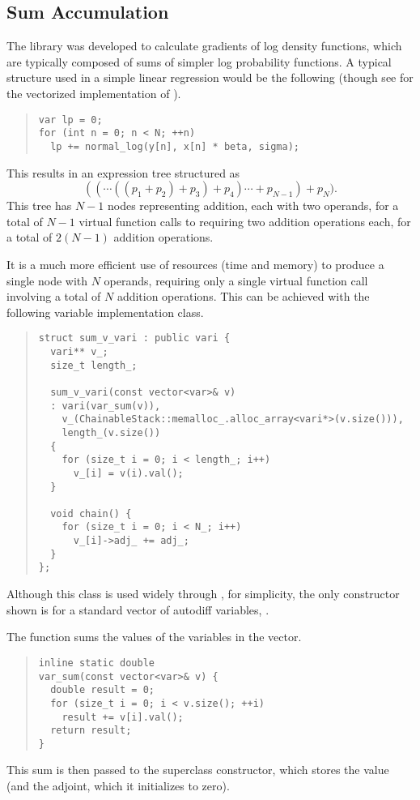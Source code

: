 \documentclass[10pt]{article}
\begin{document}
\subsection{Sum Accumulation}

The  library was developed to calculate gradients of
log density functions, which are typically composed of sums of simpler
log probability functions.  A typical structure used in a simple
linear regression would be the following (though see
 for the vectorized implementation of
).
%
\begin{quote}
\begin{Verbatim}
var lp = 0;
for (int n = 0; n < N; ++n)
  lp += normal_log(y[n], x[n] * beta, sigma);
\end{Verbatim}
\end{quote}
%
This results in an expression tree structured as
%
\[
(( \cdots ((p_1 + p_2) + p_3) + p_4) \cdots + p_{N-1}) + p_N).
\]
%
This tree has $N-1$ nodes representing addition, each with two
operands, for a total of $N-1$ virtual function calls to
 requiring two addition operations each, for a total of
$2(N-1)$ addition operations.

It is a much more efficient use of resources (time and memory) to
produce a single node with $N$ operands, requiring only a single
virtual function call involving a total of $N$ addition operations.
This can be achieved with the following variable implementation class.
%
\begin{quote}
\begin{Verbatim}
struct sum_v_vari : public vari {
  vari** v_;
  size_t length_;

  sum_v_vari(const vector<var>& v) 
  : vari(var_sum(v)), 
    v_(ChainableStack::memalloc_.alloc_array<vari*>(v.size())),
    length_(v.size())
  {
    for (size_t i = 0; i < length_; i++)
      v_[i] = v(i).val();
  }

  void chain() {
    for (size_t i = 0; i < N_; i++)
      v_[i]->adj_ += adj_;
  }
};
\end{Verbatim}
\end{quote}
%
Although this class is used widely through , for
simplicity, the only constructor shown is for a standard vector of
autodiff variables, .  

The  function sums the values of the variables in the
vector.  
%
\begin{quote}
\begin{Verbatim}
inline static double 
var_sum(const vector<var>& v) {
  double result = 0;
  for (size_t i = 0; i < v.size(); ++i)
    result += v[i].val();
  return result;
} 
\end{Verbatim}
\end{quote}
%
This sum is then passed to the superclass constructor, which stores
the value (and the adjoint, which it initializes to zero).
\end{document}
